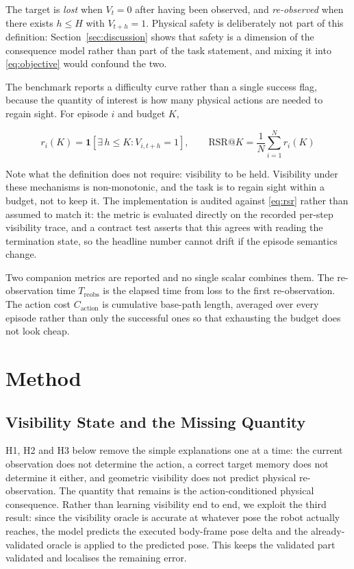 \documentclass[conference]{IEEEtran}
\begin{document}
\noindent The target is \emph{lost} when $V_t = 0$ after having been observed, and
\emph{re-observed} when there exists $h \le H$ with $V_{t+h} = 1$. Physical safety is
deliberately not part of this definition: Section~\ref{sec:discussion} shows that
safety is a dimension of the consequence model rather than part of the task statement,
and mixing it into \eqref{eq:objective} would confound the two.

The benchmark reports a difficulty curve rather than a single success flag, because
the quantity of interest is how many physical actions are needed to regain sight. For
episode $i$ and budget $K$,

\begin{equation}
r_i(K) = \mathbf{1}\!\left[\exists\, h \le K : V_{i,t+h} = 1\right],
\qquad
\mathrm{RSR}@K = \frac{1}{N}\sum_{i=1}^{N} r_i(K)
\label{eq:rsr}
\end{equation}

\noindent Note what the definition does not require: visibility to be held.
Visibility under these mechanisms is non-monotonic, and the task is to regain sight
within a budget, not to keep it. The implementation is audited against
\eqref{eq:rsr} rather than assumed to match it: the metric is evaluated directly on
the recorded per-step visibility trace, and a contract test asserts that this agrees
with reading the termination state, so the headline number cannot drift if the episode
semantics change.

Two companion metrics are reported and no single scalar combines them. The
re-observation time $T_{\mathrm{reobs}}$ is the elapsed time from loss to the first
re-observation. The action cost $C_{\mathrm{action}}$ is cumulative base-path length,
averaged over every episode rather than only the successful ones so that exhausting
the budget does not look cheap.

\section{Method}

\subsection{Visibility State and the Missing Quantity}

H1, H2 and H3 below remove the simple explanations one at a time: the current
observation does not determine the action, a correct target memory does not determine
it either, and geometric visibility does not predict physical re-observation. The
quantity that remains is the action-conditioned physical consequence. Rather than
learning visibility end to end, we exploit the third result: since the visibility
oracle is accurate at whatever pose the robot actually reaches, the model predicts the
executed body-frame pose delta and the already-validated oracle is applied to the
predicted pose. This keeps the validated part validated and localises the remaining
error.
\end{document}
